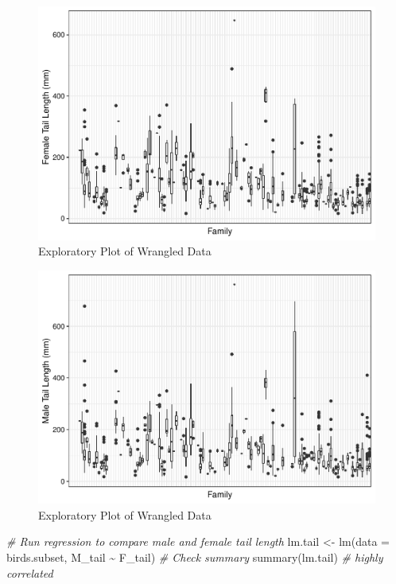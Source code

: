 \documentclass[
  12pt,
]{article}
\newenvironment{Shaded}{\begin{snugshade}}{\end{snugshade}}
\newcommand{\AttributeTok}[1]{\textcolor[rgb]{0.77,0.63,0.00}{#1}}
\newcommand{\CommentTok}[1]{\textcolor[rgb]{0.56,0.35,0.01}{\textit{#1}}}
\newcommand{\FunctionTok}[1]{\textcolor[rgb]{0.00,0.00,0.00}{#1}}
\newcommand{\NormalTok}[1]{#1}
\newcommand{\OtherTok}[1]{\textcolor[rgb]{0.56,0.35,0.01}{#1}}
\newcommand{\SpecialCharTok}[1]{\textcolor[rgb]{0.00,0.00,0.00}{#1}}
\begin{document}
\begin{figure}
\centering
\includegraphics{Project_Code_files/figure-latex/r exploratory_plots_1-1.pdf}
\caption{Exploratory Plot of Wrangled Data}
\end{figure}

\begin{figure}
\centering
\includegraphics{Project_Code_files/figure-latex/r exploratory_plots_2-1.pdf}
\caption{Exploratory Plot of Wrangled Data}
\end{figure}

\begin{Shaded}
\begin{Highlighting}[]
\CommentTok{\# Run regression to compare male and female tail length}
\NormalTok{lm.tail }\OtherTok{\textless{}{-}} \FunctionTok{lm}\NormalTok{(}\AttributeTok{data =}\NormalTok{ birds.subset, M\_tail }\SpecialCharTok{\textasciitilde{}}\NormalTok{ F\_tail)}
\CommentTok{\# Check summary}
\FunctionTok{summary}\NormalTok{(lm.tail) }\CommentTok{\# highly correlated}
\end{Highlighting}
\end{Shaded}
\end{document}
